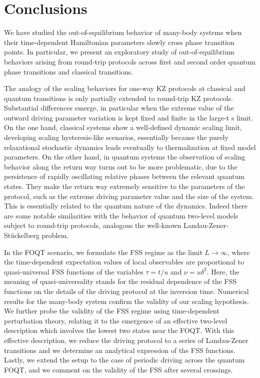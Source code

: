 \chapter{Conclusions}

We have studied the out-of-equilibrium behavior of
many-body systems when their time-dependent Hamiltonian parameters 
slowly cross phase transition points. In particular,  we present an exploratory study of 
out-of-equilibrium behaviors arising from round-trip protocols across 
first and second order quantum phase transitions and classical transitions.

The
analogy of the scaling behaviors for one-way KZ protocols
at classical and quantum transitions is only partially
extended to round-trip KZ protocols. Substantial differences
emerge, in particular when the extreme value
of the outward driving parameter variation is kept fixed and
finite in the large-t s limit. On the one hand, classical
systems show a well-defined dynamic scaling limit, 
developing scaling hysteresis-like scenarios, essentially because
the purely relaxational stochastic dynamics leads 
eventually to thermalization at fixed model parameters. On the
other hand, in quantum systems the observation of 
scaling behavior along the return way turns out to be more
problematic, due to the persistence of rapidly oscillating
relative phases between the relevant quantum states.
They make the return way extremely sensitive to the 
parameters of the protocol, such as the extreme driving parameter value
and the size of the system. This is essentially related
to the quantum nature of the dynamics. Indeed there are
some notable similarities with the behavior of quantum
two-level models subject to round-trip protocols, 
analogous the well-known Landau-Zener-Stückelberg problem.


In the FOQT scenario, we formulate the FSS regime
as the limit $L \to \infty$, where the
time-dependent expectation values of local observables
are proportional to quasi-universal FSS functions of the
variables $\tau = t/ u$ and $\nu = u\delta^2$. Here, the meaning
of quasi-universality stands for the residual dependence of
the FSS functions on the details of the driving protocol
at the inversion time. Numerical results for the many-body
system confirm the validity of our scaling hypothesis.
We further probe the validity of the FSS
regime using time-dependent perturbation theory, relating it
to the emergence of an effective two-level description which
involves the lowest two states near the FOQT. With this effective
description, we reduce the driving protocol to a series of Landau-Zener
transitions and we determine an analytical expression of the
FSS functions. Lastly, we extend the setup to the case of
periodic driving across the quantum FOQT, and we comment on
the validity of the FSS after several crossings.



